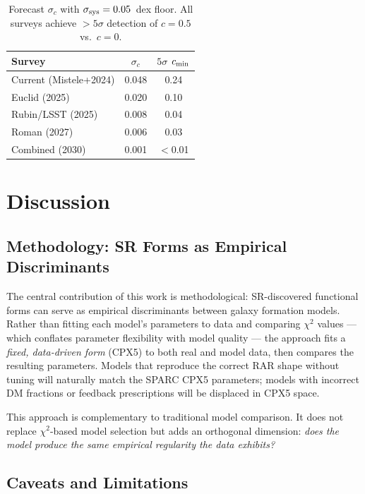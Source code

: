 \documentclass[twocolumn]{aastex631}
\begin{document}
\begin{table}
\centering
\caption{Forecast $\sigma_c$ with $\sigma_{\rm sys} = 0.05$~dex floor.
All surveys achieve $>5\sigma$ detection of $c=0.5$ vs.\ $c=0$.}
\begin{tabular}{lcc}
\hline
Survey & $\sigma_c$ & $5\sigma$ $c_{\rm min}$ \\
\hline
Current (Mistele+2024)   & 0.048 & 0.24 \\
Euclid (2025)             & 0.020 & 0.10 \\
Rubin/LSST (2025)         & 0.008 & 0.04 \\
Roman (2027)              & 0.006 & 0.03 \\
Combined (2030)           & 0.001 & $<$0.01 \\
\hline
\end{tabular}
\label{tab:forecast}
\end{table}

\section{Discussion}

\subsection{Methodology: SR Forms as Empirical Discriminants}

The central contribution of this work is methodological: SR-discovered
functional forms can serve as empirical discriminants between galaxy
formation models.  Rather than fitting each model's parameters to data
and comparing $\chi^2$ values --- which conflates parameter flexibility
with model quality --- the approach fits a \emph{fixed, data-driven form}
(CPX5) to both real and model data, then compares the resulting
parameters.  Models that reproduce the correct RAR shape without tuning
will naturally match the SPARC CPX5 parameters; models with incorrect
DM fractions or feedback prescriptions will be displaced in CPX5 space.

This approach is complementary to traditional model comparison.  It does
not replace $\chi^2$-based model selection but adds an orthogonal
dimension: \emph{does the model produce the same empirical regularity
the data exhibits?}

\subsection{Caveats and Limitations}
\end{document}
